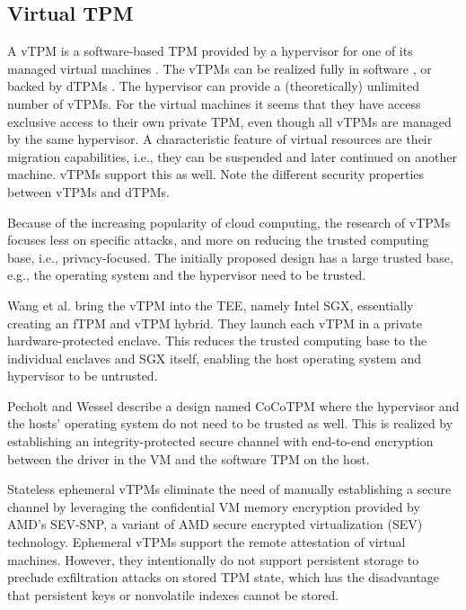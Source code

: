 \subsection{Virtual TPM}

A vTPM is a software-based TPM provided by a hypervisor for one of its managed virtual machines \cite{268868}. The vTPMs can be realized fully in software \cite{268868}, or backed by dTPMs \cite{Liu2010}. The hypervisor can provide a (theoretically) unlimited number of vTPMs. For the virtual machines it seems that they have access exclusive access to their own private TPM, even though all vTPMs are managed by the same hypervisor. A characteristic feature of virtual resources are their migration capabilities, i.e., they can be suspended and later continued on another machine. vTPMs support this as well. Note the different security properties between vTPMs and dTPMs.

Because of the increasing popularity of cloud computing, the research of vTPMs focuses less on specific attacks, and more on reducing the trusted computing base, i.e., privacy-focused. The initially proposed design \cite{268868} has a large trusted base, e.g., the operating system and the hypervisor need to be trusted.

Wang et al. \cite{Wang2019} bring the vTPM into the \ac{TEE}, namely Intel SGX, essentially creating an fTPM and vTPM hybrid. They launch each vTPM in a private hardware-protected enclave. This reduces the trusted computing base to the individual enclaves and SGX itself, enabling the host operating system and hypervisor to be untrusted.

Pecholt and Wessel \cite{Pecholt2022} describe a design named CoCoTPM where the hypervisor and the hosts' operating system do not need to be trusted as well. This is realized by establishing an integrity-protected secure channel with end-to-end encryption between the driver in the VM and the software TPM on the host.

Stateless ephemeral vTPMs \cite{Narayanan2023} eliminate the need of manually establishing a secure channel by leveraging the confidential VM memory encryption provided by AMD's SEV-SNP, a variant of AMD secure encrypted virtualization (SEV) technology.
Ephemeral vTPMs support the remote attestation of virtual machines.
However, they intentionally do not support persistent storage to preclude exfiltration attacks on stored TPM state, which has the disadvantage that persistent keys or nonvolatile indexes cannot be stored.


